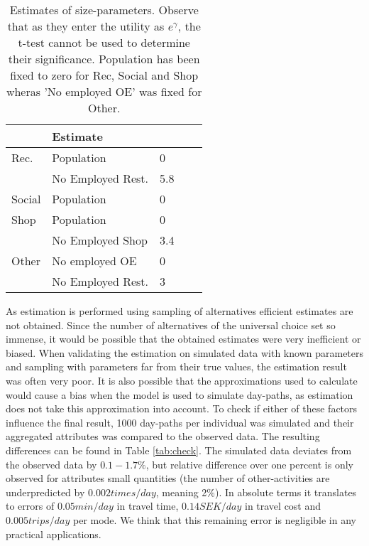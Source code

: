 \begin{table}\caption{Estimates of size-parameters. Observe that as they enter the utility as $e^\gamma$, the t-test cannot be used to determine their significance. Population has been fixed to zero for Rec, Social and Shop wheras 'No employed OE' was fixed for Other. \label{tab:est2}}
\centering
\begin{tabular}{lllll}
\toprule
\noalign{\smallskip}
 \multicolumn{2}{c}{Parameter} & Estimate          \\
\midrule
Rec.        	& Population &          0 \\
                &   No Employed Rest. &        5.8  \\ 
 \noalign{\smallskip}
Social      & Population               & 0       \\ 
\noalign{\smallskip}
Shop       & Population               & 0         \\ 
                &             No Employed Shop &        3.4 \\
\noalign{\smallskip}
Other      & No employed OE               & 0           \\ 
               &        No Employed Rest. &          3 
\end{tabular}
\end{table}

As estimation is performed using sampling of alternatives efficient estimates are not obtained. Since the number of alternatives of the universal choice set so immense, it would be possible that the obtained estimates were very inefficient or biased. When validating the estimation on simulated data with known parameters and sampling with parameters far from their true values, the estimation result was often very poor. It is also possible that the approximations used to calculate \aeutil would cause a bias when the model is used to simulate day-paths, as estimation does not take this approximation into account. To check if either of these factors influence the final result, 1000 day-paths per individual was simulated and their aggregated attributes was compared to the observed data. The resulting differences can be found in Table \ref{tab:check}. The simulated data deviates from the observed data by $0.1-1.7\%$, but relative difference over one percent is only observed for attributes small quantities (the number of other-activities are underpredicted by $0.002\unit{times/day}$, meaning 2$\%$). In absolute terms it translates to errors of $0.05\unit{min/day}$ in travel time, $0.14\unit{SEK/day}$ in travel cost and $0.005\unit{trips/day}$ per mode. We think that this remaining error is negligible in any practical applications. 


